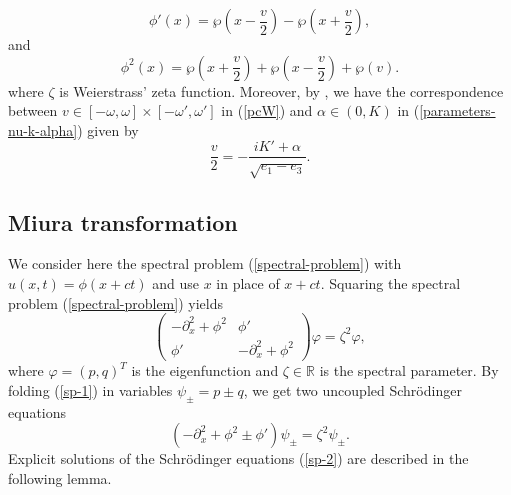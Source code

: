 \documentclass[12pt,reqno]{amsart}
\numberwithin{equation}{section}
\begin{document}
\begin{equation}
\label{philinha}
\phi' (x) = \wp\left(x-\frac{v}{2} \right) - \wp\left(x+\frac{v}{2}\right),
\end{equation}
and
\begin{equation}
\label{form-3-squared}
\phi^2(x) = \wp\left(x + \frac{v}{2}\right) + \wp\left(x - \frac{v}{2}\right) + \wp(v).
\end{equation}
where $\zeta$ is Weierstrass' zeta function. Moreover, by \cite[Lemma 3.6]{AP25},
we have the correspondence between $v \in [-\omega,\omega] \times [-\omega',\omega']$ in (\ref{pcW}) and $\alpha \in (0,K)$ in (\ref{parameters-nu-k-alpha}) given by 
\begin{equation}
\label{v-alpha-correspondence}
\frac{v}{2} = -\frac{iK' + \alpha}{\sqrt{e_1-e_3}}.
\end{equation}
 


\subsection{Miura transformation}
\label{sec-2-2}

We consider here the spectral problem (\ref{spectral-problem}) with $u(x,t) = \phi(x+ct)$ and use $x$ in place of $x + ct$. Squaring the spectral problem (\ref{spectral-problem}) yields 
\begin{equation}
\label{sp-1}
\left( \begin{matrix} -\partial_x^2 + \phi^2 & \phi' \\
\phi' & -\partial_x^2 + \phi^2 \end{matrix} \right) \varphi = \zeta^2 \varphi,
\end{equation}
where  $\varphi = (p,q)^T $ is the eigenfunction and $\zeta \in \mathbb{R}$ is the spectral parameter. By folding (\ref{sp-1}) in variables $\psi_{\pm} = p \pm q$,  we get two uncoupled Schr\"{o}dinger equations 
\begin{equation}
\label{sp-2} 
\left( - \partial_x^2 + \phi^2 \pm \phi' \right) \psi_{\pm} = \zeta^2 \psi_{\pm}.
\end{equation}
Explicit solutions of the Schr\"{o}dinger equations (\ref{sp-2}) are described in the following lemma. 
\end{document}
